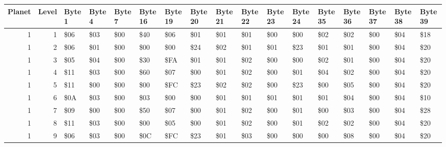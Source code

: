 \begin{tabular}{rrlllllllllllllll}
\hline
   Planet &   Level & Byte 1    & Byte 4    & Byte 7    & Byte 16   & Byte 19   & Byte 20   & Byte 21   & Byte 22   & Byte 23   & Byte 24   & Byte 35   & Byte 36   & Byte 37   & Byte 38   & Byte 39   \\
\hline
        1 &       1 & \$06       & \$03       & \$00       & \$40       & \$06       & \$01       & \$01       & \$01       & \$00       & \$00       & \$02       & \$02       & \$00       & \$04       & \$18       \\
        1 &       2 & \$06       & \$01       & \$00       & \$00       & \$00       & \$24       & \$02       & \$01       & \$01       & \$23       & \$01       & \$01       & \$00       & \$04       & \$20       \\
        1 &       3 & \$05       & \$04       & \$00       & \$30       & \$FA       & \$01       & \$01       & \$02       & \$00       & \$00       & \$02       & \$01       & \$00       & \$04       & \$20       \\
        1 &       4 & \$11       & \$03       & \$00       & \$60       & \$07       & \$00       & \$01       & \$02       & \$00       & \$01       & \$04       & \$02       & \$00       & \$04       & \$20       \\
        1 &       5 & \$11       & \$00       & \$00       & \$00       & \$FC       & \$23       & \$02       & \$02       & \$00       & \$23       & \$00       & \$05       & \$00       & \$04       & \$20       \\
        1 &       6 & \$0A       & \$03       & \$00       & \$03       & \$00       & \$00       & \$01       & \$01       & \$01       & \$01       & \$01       & \$04       & \$00       & \$04       & \$10       \\
        1 &       7 & \$09       & \$00       & \$00       & \$50       & \$07       & \$00       & \$01       & \$02       & \$00       & \$01       & \$00       & \$03       & \$00       & \$04       & \$28       \\
        1 &       8 & \$11       & \$03       & \$00       & \$00       & \$05       & \$00       & \$01       & \$02       & \$00       & \$01       & \$02       & \$02       & \$00       & \$04       & \$20       \\
        1 &       9 & \$06       & \$03       & \$00       & \$0C       & \$FC       & \$23       & \$01       & \$03       & \$00       & \$00       & \$00       & \$08       & \$00       & \$04       & \$20       \\

\end{tabular}
